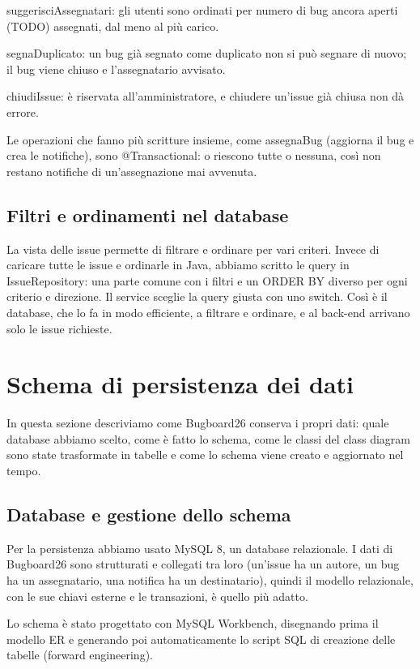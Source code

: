  suggerisciAssegnatari: gli utenti sono ordinati per numero di 
bug ancora aperti (TODO) assegnati, dal meno al più carico. 

 segnaDuplicato: un bug già segnato come duplicato non si può 
segnare di nuovo; il bug viene chiuso e l'assegnatario avvisato. 

 chiudiIssue: è riservata all'amministratore, e chiudere 
un'issue già chiusa non dà errore. 

\noindent Le operazioni che fanno più scritture insieme, come assegnaBug 
(aggiorna il bug e crea le notifiche), sono @Transactional: o riescono 
tutte o nessuna, così non restano notifiche di un'assegnazione mai avvenuta. 

\subsection{Filtri e ordinamenti nel database}
La vista delle issue permette di filtrare e ordinare per vari criteri. 
Invece di caricare tutte le issue e ordinarle in Java, abbiamo scritto 
le query in IssueRepository: una parte comune con i filtri e un ORDER BY 
diverso per ogni criterio e direzione. Il service sceglie la query giusta 
con uno switch. Così è il database, che lo fa in modo efficiente, a filtrare e 
ordinare, e al back-end arrivano solo le issue richieste. 

\section{Schema di persistenza dei dati}
In questa sezione descriviamo come Bugboard26 conserva i propri dati: 
quale database abbiamo scelto, come è fatto lo schema, come le classi del 
class diagram sono state trasformate in tabelle e come lo schema viene creato 
e aggiornato nel tempo. 

\subsection{Database e gestione dello schema}
Per la persistenza abbiamo usato MySQL 8, un database relazionale. I 
dati di Bugboard26 sono strutturati e collegati tra loro (un'issue ha un 
autore, un bug ha un assegnatario, una notifica ha un destinatario), quindi 
il modello relazionale, con le sue chiavi esterne e le transazioni, è quello più adatto. 

Lo schema è stato progettato con MySQL Workbench, disegnando prima il 
modello ER e generando poi automaticamente lo script SQL di creazione delle 
tabelle (forward engineering). 

